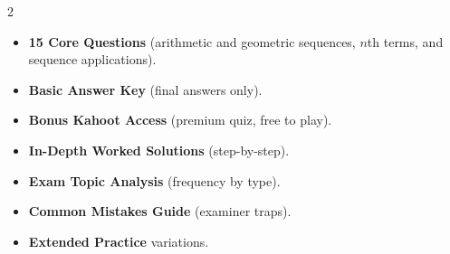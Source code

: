 \documentclass[11pt,a4paper]{article}
\newcommand{\FullReleaseDate}{April 30, 2026}
\begin{document}
\vspace{8pt}

\begin{multicols}{2}
  \begin{tcolorbox}[card, title=\sffamily\bfseries\textcolor{white}{\faHandPointDown\ TODAY (Simplified Version)}, colbacktitle=mainblue, boxed title style={sharp corners, boxrule=0pt}]
    \begin{itemize}[leftmargin=1.2em, itemsep=2pt]
      \item \small \textbf{15 Core Questions} (arithmetic and geometric sequences, \(n\)th terms, and sequence applications).
      \item \small \textbf{Basic Answer Key} (final answers only).
      \item \small \textbf{Bonus Kahoot Access} (premium quiz, free to play).
    \end{itemize}
  \end{tcolorbox}

  \columnbreak

  \begin{tcolorbox}[card, title=\sffamily\bfseries\textcolor{white}{\faRocket\ ON \FullReleaseDate\ (Full Upgrade)}, colbacktitle=mainblue, boxed title style={sharp corners, boxrule=0pt}]
    \begin{itemize}[leftmargin=1.2em, itemsep=2pt]
      \item \small \textbf{In-Depth Worked Solutions} (step-by-step).
      \item \small \textbf{Exam Topic Analysis} (frequency by type).
      \item \small \textbf{Common Mistakes Guide} (examiner traps).
      \item \small \textbf{Extended Practice} variations.
    \end{itemize}
  \end{tcolorbox}
\end{multicols}
\end{document}
